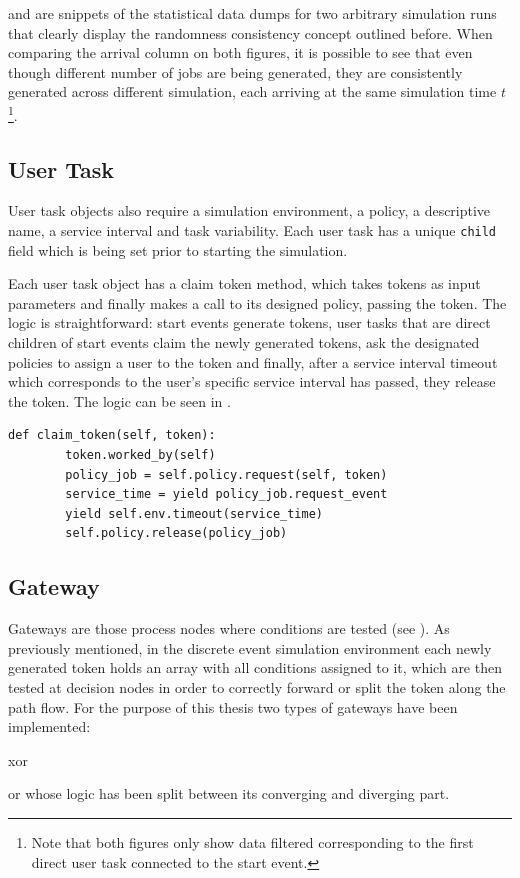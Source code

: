  and  are snippets of the statistical data dumps for two arbitrary simulation runs that clearly display the randomness consistency concept outlined before. When comparing the arrival column on both figures, it is possible to see that even though different number of jobs are being generated, they are consistently generated across different simulation, each arriving at the same simulation time $t$\footnote{Note that both figures only show data filtered corresponding to the first direct user task connected to the start event.}.

\subsection{User Task}
\label{subsec:user_task}

User task objects also require a simulation environment, a policy, a descriptive name, a service interval and task variability. Each user task has a unique \texttt{child} field which is being set prior to starting the simulation.

Each user task object has a claim token method, which takes tokens as input parameters and finally makes a call to its designed policy, passing the token. The logic is straightforward: start events generate tokens, user tasks that are direct children of start events claim the newly generated tokens, ask the designated policies to assign a user to the token and finally, after a service interval timeout which corresponds to the user's specific service interval has passed, they release the token. The logic can be seen in .

\begin{lstlisting}[caption=User task claim method,label=lst:user_task,style=CustomPython]
    def claim_token(self, token):
        token.worked_by(self)
        policy_job = self.policy.request(self, token)
        service_time = yield policy_job.request_event
        yield self.env.timeout(service_time)
        self.policy.release(policy_job)
\end{lstlisting}

\subsection{Gateway}

Gateways are those process nodes where conditions are tested (see ). As previously mentioned, in the discrete event simulation environment each newly generated token holds an array with all conditions assigned to it, which are then tested at decision nodes in order to correctly forward or split the token along the path flow. For the purpose of this thesis two types of gateways have been implemented:
\begin{enumerate*}
     \item \gls{xor}
     \item \gls{or} whose logic has been split between its converging and diverging part.
 \end{enumerate*} 

